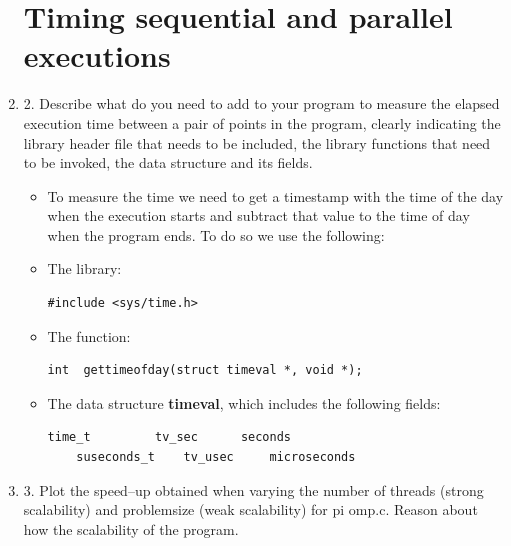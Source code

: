 \documentclass[12pt]{article}
\begin{document}
\begin{enumerate}
\section*{Timing sequential and parallel executions}

\item[] 2. Describe what do you need to add to your program to measure the elapsed execution time between a pair of points in the program, clearly indicating the library header file that needs to be included, the library functions that need to be invoked, the data structure and its fields.


\begin{itemize}

\item[] To measure the time we need to get a timestamp with the time of the day when the execution starts and subtract that value to the time of day when the program ends. To do so we use the following:

\item The library:
\begin{lstlisting}[style=CStyle]
	#include <sys/time.h>
\end{lstlisting}

\item The function:
\begin{lstlisting}[style=CStyle]
	int  gettimeofday(struct timeval *, void *);
\end{lstlisting}

\item The data structure \textbf{timeval}, which includes the following fields:

\begin{lstlisting}[style=CStyle]
	time_t         tv_sec      seconds
	suseconds_t    tv_usec     microseconds
\end{lstlisting}





\end{itemize}




\item[] 3. Plot the speed–up obtained when varying the number of threads (strong scalability) and problemsize (weak scalability) for pi omp.c. Reason about how the scalability of the program.


\end{enumerate}
\end{document}
